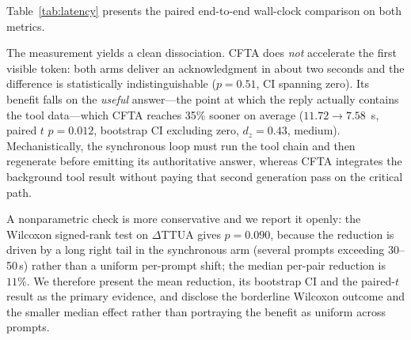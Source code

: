 \documentclass[numbered,mediumone,traditional]{oup-authoring-template}
\begin{document}
Table~\ref{tab:latency} presents the paired end-to-end wall-clock comparison on both metrics.

\begin{table}[htbp]
\caption{Paired end-to-end wall-clock measurement: synchronous vs.\ CFTA, over $n = 38$ clean prompt pairs (per-prompt means over repeated trials). $\Delta$ is sync${-}$CFTA; $p$ is from the paired $t$-test; CI is the $5{,}000$-resample bootstrap 95\% CI of $\Delta$.}
\label{tab:latency}
\centering
\small
{}
\end{table}

The measurement yields a clean dissociation. CFTA does \emph{not} accelerate the first visible token: both arms deliver an acknowledgment in about two seconds and the difference is statistically indistinguishable ($p = 0.51$, CI spanning zero). Its benefit falls on the \emph{useful} answer---the point at which the reply actually contains the tool data---which CFTA reaches 35\% sooner on average ($11.72 \to 7.58$~s, paired $t$ $p = 0.012$, bootstrap CI excluding zero, $d_z = 0.43$, medium). Mechanistically, the synchronous loop must run the tool chain and then regenerate before emitting its authoritative answer, whereas CFTA integrates the background tool result without paying that second generation pass on the critical path.

A nonparametric check is more conservative and we report it openly: the Wilcoxon signed-rank test on $\Delta$TTUA gives $p = 0.090$, because the reduction is driven by a long right tail in the synchronous arm (several prompts exceeding 30--50\,s) rather than a uniform per-prompt shift; the median per-pair reduction is $11\%$. We therefore present the mean reduction, its bootstrap CI and the paired-$t$ result as the primary evidence, and disclose the borderline Wilcoxon outcome and the smaller median effect rather than portraying the benefit as uniform across prompts.
\end{document}
